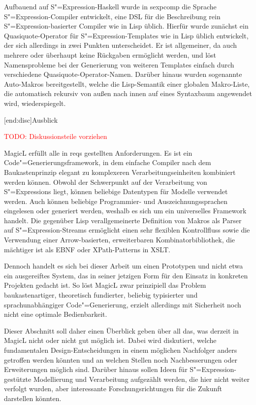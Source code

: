 \documentclass[11pt, a4paper, bibgerm]{scrbook}
\newcommand{\todo}[1]{
  \textcolor{red}{TODO: #1}
}
\newcommand\lsection{}
\newcommand\cref{}
\newcommand{\sexp}{S"=Expression}
\newcommand{\sexps}{S"=Expressions}
\newcommand{\cgen}{Code"=Generierung}
\begin{document}
Aufbauend auf \sexp{}-Haskell wurde in \cref{sexpcomp} die Sprache
\sexp{}-Compiler entwickelt, eine DSL für die Beschreibung rein
\sexp{}-basierter Compiler wie in Lisp üblich. Hierfür wurde zunächst
ein Quasiquote-Operator für \sexp{}-Templates wie in Lisp üblich
entwickelt, der sich allerdings in zwei Punkten unterscheidet. Er ist
allgemeiner, da auch mehrere oder überhaupt keine Rückgaben ermöglicht
werden, und löst Namensprobleme bei der Generierung von weiteren
Templates einfach durch verschiedene Quasiquote-Operator-Namen. Darüber
hinaus wurden sogenannte Auto-Makros bereitgestellt, welche die
Lisp-Semantik einer globalen Makro-Liste, die automatisch rekursiv von
außen nach innen auf eines Syntaxbaum angewendet wird, wiederspiegelt.

\lsection[end:disc]{Ausblick}

\todo{Diskussionsteile vorziehen}

MagicL erfüllt alle in \cref{reqs} gestellten Anforderungen. Es ist ein
\cgen{}sframework, in dem einfache Compiler nach dem Baukastenprinzip
elegant zu komplexeren Verarbeitungseinheiten kombiniert werden
können. Obwohl der Schwerpunkt auf der Verarbeitung von \sexps{} liegt,
können beliebige Datentypen für Modelle verwendet werden. Auch können
beliebige Programmier- und Auszeichnungssprachen eingelesen oder
generiert werden, weshalb es sich um ein universelles Framework handelt.
Die gegenüber Lisp verallgemeinerte Definition von Makros als Parser
auf \sexp{}-Streams ermöglicht einen sehr flexiblen Kontrollfluss sowie
die Verwendung einer Arrow-basierten, erweiterbaren
Kombinatorbibliothek, die mächtiger ist als EBNF oder XPath-Patterns
in XSLT.

Dennoch handelt es sich bei dieser Arbeit um einen Prototypen und nicht
etwa ein ausgereiftes System, das in seiner jetzigen Form für den
Einsatz in konkreten Projekten gedacht ist. So löst MagicL zwar
prinzipiell das Problem baukastenartiger, theoretisch fundierter,
beliebig typisierter und sprachunabhängiger \cgen{}, erzielt allerdings
mit Sicherheit noch nicht eine optimale Bedienbarkeit.

Dieser Abschnitt soll daher einen Überblick geben über all das, was
derzeit in MagicL nicht oder nicht gut möglich ist. Dabei wird
diskutiert, welche fundamentalen Design-Entscheidungen in einem möglichen
Nachfolger anders getroffen werden könnten und an welchen Stellen noch
Nachbesserungen oder Erweiterungen möglich sind. Darüber hinaus sollen
Ideen für \sexp{}-gestützte Modellierung und Verarbeitung aufgezählt
werden, die hier nicht weiter verfolgt wurden, aber interessante
Forschungsrichtungen für die Zukunft darstellen könnten.
\end{document}
